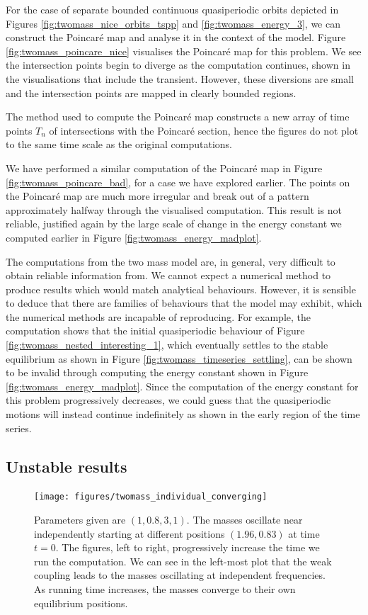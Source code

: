 For the case of separate bounded continuous quasiperiodic orbits depicted in Figures \ref{fig:twomass_nice_orbits_tspp} and \ref{fig:twomass_energy_3},
we can construct the Poincar\'e map and analyse it in the context of the model.
Figure \ref{fig:twomass_poincare_nice} visualises the Poincar\'e map for this problem.
We see the intersection points begin to diverge as the computation continues,
shown in the visualisations that include the transient.
However, these diversions are small and the intersection points are mapped in clearly bounded regions.

The method used to compute the Poincar\'e map \cite{manohar_2011} constructs a new array of time points $T_n$ of intersections with the Poincar\'e section,
hence the figures do not plot to the same time scale as the original computations.

We have performed a similar computation of the Poincar\'e map in Figure \ref{fig:twomass_poincare_bad},
for a case we have explored earlier.
The points on the Poincar\'e map are much more irregular and break out of a pattern approximately halfway through the visualised computation.
This result is not reliable, justified again by the large scale of change in the energy constant we computed earlier in Figure \ref{fig:twomass_energy_madplot}.

The computations from the two mass model are, in general, very difficult to obtain reliable information from.
We cannot expect a numerical method to produce results which would match analytical behaviours.
However, it is sensible to deduce that there are families of behaviours that the model may exhibit,
which the numerical methods are incapable of reproducing.
For example, the computation shows that the initial quasiperiodic behaviour of Figure \ref{fig:twomass_nested_interesting_1},
which eventually settles to the stable equilibrium as shown in Figure \ref{fig:twomass_timeseries_settling},
can be shown to be invalid through computing the energy constant shown in Figure \ref{fig:twomass_energy_madplot}.
Since the computation of the energy constant for this problem progressively decreases,
we could guess that the quasiperiodic motions will instead continue indefinitely as shown in the early region of the time series.

\subsection{Unstable results}

\begin{figure}[h!]
	\centering
	\texttt{[image: figures/twomass\_individual\_converging]}
	\caption{
		Parameters given are \((1, 0.8, 3, 1)\). The masses oscillate near independently starting at different positions $(1.96, 0.83)$ at time $t=0$.
		The figures, left to right, progressively increase the time we run the computation.
		We can see in the left-most plot that the weak coupling leads to the masses oscillating at independent frequencies.
		As running time increases, the masses converge to their own equilibrium positions.
	}
	\label{fig:twomass_independent}
\end{figure}

